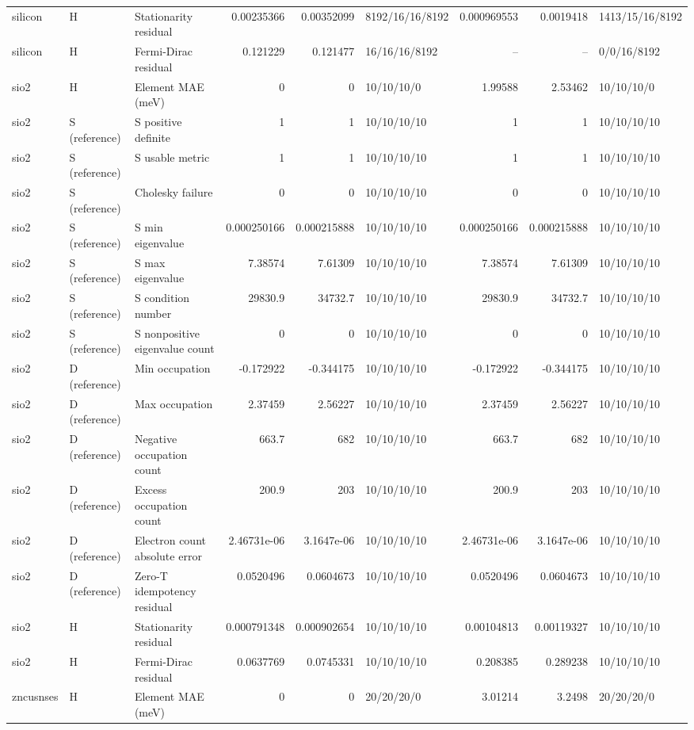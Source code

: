\begin{tabular}{lllrrlrrl}
silicon & H & Stationarity residual & 0.00235366 & 0.00352099 & 8192/16/16/8192 & 0.000969553 & 0.0019418 & 1413/15/16/8192 \\
silicon & H & Fermi-Dirac residual & 0.121229 & 0.121477 & 16/16/16/8192 & -- & -- & 0/0/16/8192 \\
sio2 & H & Element MAE (meV) & 0 & 0 & 10/10/10/0 & 1.99588 & 2.53462 & 10/10/10/0 \\
sio2 & S (reference) & S positive definite & 1 & 1 & 10/10/10/10 & 1 & 1 & 10/10/10/10 \\
sio2 & S (reference) & S usable metric & 1 & 1 & 10/10/10/10 & 1 & 1 & 10/10/10/10 \\
sio2 & S (reference) & Cholesky failure & 0 & 0 & 10/10/10/10 & 0 & 0 & 10/10/10/10 \\
sio2 & S (reference) & S min eigenvalue & 0.000250166 & 0.000215888 & 10/10/10/10 & 0.000250166 & 0.000215888 & 10/10/10/10 \\
sio2 & S (reference) & S max eigenvalue & 7.38574 & 7.61309 & 10/10/10/10 & 7.38574 & 7.61309 & 10/10/10/10 \\
sio2 & S (reference) & S condition number & 29830.9 & 34732.7 & 10/10/10/10 & 29830.9 & 34732.7 & 10/10/10/10 \\
sio2 & S (reference) & S nonpositive eigenvalue count & 0 & 0 & 10/10/10/10 & 0 & 0 & 10/10/10/10 \\
sio2 & D (reference) & Min occupation & -0.172922 & -0.344175 & 10/10/10/10 & -0.172922 & -0.344175 & 10/10/10/10 \\
sio2 & D (reference) & Max occupation & 2.37459 & 2.56227 & 10/10/10/10 & 2.37459 & 2.56227 & 10/10/10/10 \\
sio2 & D (reference) & Negative occupation count & 663.7 & 682 & 10/10/10/10 & 663.7 & 682 & 10/10/10/10 \\
sio2 & D (reference) & Excess occupation count & 200.9 & 203 & 10/10/10/10 & 200.9 & 203 & 10/10/10/10 \\
sio2 & D (reference) & Electron count absolute error & 2.46731e-06 & 3.1647e-06 & 10/10/10/10 & 2.46731e-06 & 3.1647e-06 & 10/10/10/10 \\
sio2 & D (reference) & Zero-T idempotency residual & 0.0520496 & 0.0604673 & 10/10/10/10 & 0.0520496 & 0.0604673 & 10/10/10/10 \\
sio2 & H & Stationarity residual & 0.000791348 & 0.000902654 & 10/10/10/10 & 0.00104813 & 0.00119327 & 10/10/10/10 \\
sio2 & H & Fermi-Dirac residual & 0.0637769 & 0.0745331 & 10/10/10/10 & 0.208385 & 0.289238 & 10/10/10/10 \\
zncusnses & H & Element MAE (meV) & 0 & 0 & 20/20/20/0 & 3.01214 & 3.2498 & 20/20/20/0 \\
\bottomrule
\end{tabular}
